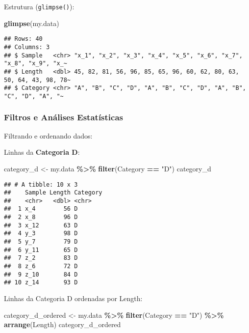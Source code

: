 \documentclass[
]{article}
\newenvironment{Shaded}{\begin{snugshade}}{\end{snugshade}}
\newcommand{\FunctionTok}[1]{\textcolor[rgb]{0.13,0.29,0.53}{\textbf{#1}}}
\newcommand{\NormalTok}[1]{#1}
\newcommand{\OtherTok}[1]{\textcolor[rgb]{0.56,0.35,0.01}{#1}}
\newcommand{\SpecialCharTok}[1]{\textcolor[rgb]{0.81,0.36,0.00}{\textbf{#1}}}
\newcommand{\StringTok}[1]{\textcolor[rgb]{0.31,0.60,0.02}{#1}}
\begin{document}
Estrutura (\texttt{glimpse()}):

\begin{Shaded}
\begin{Highlighting}[]
\FunctionTok{glimpse}\NormalTok{(my.data)}
\end{Highlighting}
\end{Shaded}

\begin{verbatim}
## Rows: 40
## Columns: 3
## $ Sample   <chr> "x_1", "x_2", "x_3", "x_4", "x_5", "x_6", "x_7", "x_8", "x_9", "x_~
## $ Length   <dbl> 45, 82, 81, 56, 96, 85, 65, 96, 60, 62, 80, 63, 50, 64, 43, 98, 78~
## $ Category <chr> "A", "B", "C", "D", "A", "B", "C", "D", "A", "B", "C", "D", "A", "~
\end{verbatim}

\subsubsection{Filtros e Análises
Estatísticas}\label{filtros-e-anuxe1lises-estatuxedsticas}

Filtrando e ordenando dados:

Linhas da \textbf{Categoria D}:

\begin{Shaded}
\begin{Highlighting}[]
\NormalTok{category\_d }\OtherTok{\textless{}{-}}\NormalTok{ my.data }\SpecialCharTok{\%\textgreater{}\%} 
  \FunctionTok{filter}\NormalTok{(Category }\SpecialCharTok{==} \StringTok{"D"}\NormalTok{)}
\NormalTok{category\_d}
\end{Highlighting}
\end{Shaded}

\begin{verbatim}
## # A tibble: 10 x 3
##    Sample Length Category
##    <chr>   <dbl> <chr>   
##  1 x_4        56 D       
##  2 x_8        96 D       
##  3 x_12       63 D       
##  4 y_3        98 D       
##  5 y_7        79 D       
##  6 y_11       65 D       
##  7 z_2        83 D       
##  8 z_6        72 D       
##  9 z_10       84 D       
## 10 z_14       93 D
\end{verbatim}

Linhas da Categoria D ordenadas por Length:

\begin{Shaded}
\begin{Highlighting}[]
\NormalTok{category\_d\_ordered }\OtherTok{\textless{}{-}}\NormalTok{ my.data }\SpecialCharTok{\%\textgreater{}\%} 
  \FunctionTok{filter}\NormalTok{(Category }\SpecialCharTok{==} \StringTok{"D"}\NormalTok{) }\SpecialCharTok{\%\textgreater{}\%} 
  \FunctionTok{arrange}\NormalTok{(Length)}
\NormalTok{category\_d\_ordered}
\end{Highlighting}
\end{Shaded}
\end{document}
